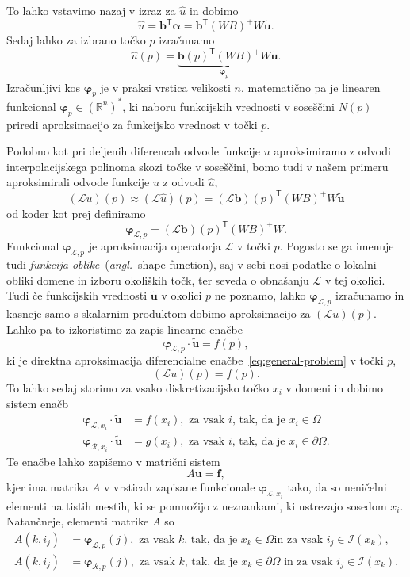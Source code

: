 \documentclass[a4paper,twoside]{article}
\theoremstyle{definition} %
\theoremstyle{plain} %
\numberwithin{equation}{section}
\newcommand{\R}{\mathbb R}
\newcommand{\Rc}{\mathcal{R}}
\newcommand{\I}{\mathcal{I}}
\renewcommand{\L}{\mathcal{L}}
\newcommand{\T}{\mathsf{T}}
\renewcommand{\b}{\boldsymbol}
\renewcommand{\phi}{\varphi}
\newcommand{\uh}{\hat{u}}
\newcommand{\ang}[1]{(\textit{angl.}\ #1)}
\begin{document}
To lahko vstavimo nazaj v izraz za $\hat{u}$ in dobimo
\[
  \hat{u} = \b{b}^\T\b{\alpha} = \b{b}^\T(WB)^{+}W\b{\tilde{u}}.
\]
Sedaj lahko za izbrano točko $p$ izračunamo
\[
  \hat{u}(p) = \underbrace{\b{b}(p)^\T(WB)^{+}W}_{\b\phi_p}\b{\tilde{u}}.
\]
Izračunljivi kos $\b\phi_p$ je v praksi vrstica velikosti $n$, matematično pa je
linearen funkcional $\b\phi_p \in (\R^n)^\ast$, ki naboru funkcijskih vrednosti v
soseščini $N(p)$ priredi aproksimacijo za funkcijsko vrednost v točki $p$.

Podobno kot pri deljenih diferencah odvode funkcije $u$ aproksimiramo z odvodi
interpolacijskega polinoma skozi točke v soseščini, bomo tudi v našem primeru
aproksimirali odvode funkcije $u$ z odvodi $\uh$,
\[
  (\L u)(p) \approx (\L \uh)(p) = (\L\b{b})(p)^\T(WB)^{+}W \b{\tilde{u}}
\]
od koder kot prej definiramo
\begin{equation}
  \b\phi_{\L,p} = (\L\b{b})(p)^\T(WB)^{+}W.
  \label{eq:shape-definition}
\end{equation}
Funkcional $\b\phi_{\L,p}$ je aproksimacija operatorja $\L$ v točki $p$.
Pogosto se ga imenuje tudi \emph{funkcija oblike}~\ang{shape function}, saj v
sebi nosi podatke o lokalni obliki domene in izboru okoliških točk, ter seveda o
obnašanju $\L$ v tej okolici. Tudi če funkcijskih vrednosti $\b{\tilde{u}}$ v
okolici $p$ ne poznamo, lahko $\b\phi_{\L, p}$ izračunamo in kasneje samo s
skalarnim produktom dobimo aproksimacijo za $(\L u)(p)$. Lahko pa to izkoristimo
za zapis linearne enačbe
\[
  \b\phi_{\L,p} \cdot \b{\tilde{u}} = f(p),
\]
ki je direktna aproksimacija diferencialne enačbe~\eqref{eq:general-problem} v točki
$p$,
\[
  (\L u)(p) = f(p).
\]
To lahko sedaj storimo za vsako diskretizacijsko točko $x_i$ v domeni in
dobimo sistem enačb
\begin{align*}
  \b\phi_{\L,x_i} \cdot \b{\tilde{u}} &= f(x_i), \text{ za vsak $i$, tak, da je $x_i \in \Omega$ } \\
  \b\phi_{\Rc,x_i} \cdot \b{\tilde{u}} &= g(x_i), \text{ za vsak $i$, tak, da je $x_i \in \partial\Omega$.}
\end{align*}
Te enačbe lahko zapišemo v matrični sistem
\begin{equation}
  A\b{u} = \b{f},
  \label{eq:discretized-system}
\end{equation}
kjer ima matrika $A$ v vrsticah zapisane funkcionale $\b\phi_{\L,x_i}$ tako, da so
neničelni elementi na tistih mestih, ki se pomnožijo z neznankami, ki ustrezajo
sosedom $x_i$. Natančneje, elementi matrike $A$ so
\begin{align*}
  A(k, i_j) &= \b\phi_{\L,p}(j), \text{ za vsak $k$, tak, da je $x_k \in \Omega$
  in za vsak $i_j \in \I(x_k)$,} \\
  A(k, i_j) &= \b\phi_{\Rc,p}(j), \text{ za vsak $k$, tak, da je $x_k \in
  \partial\Omega$ in za vsak $i_j \in \I(x_k)$.}
\end{align*}
\end{document}
